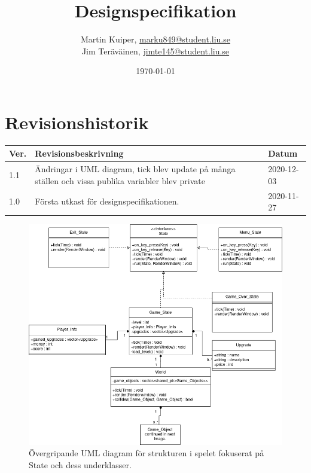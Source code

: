 \documentclass{TDP005mall}
\author{Martin Kuiper, \url{marku849@student.liu.se}\\
  Jim Teräväinen, \url{jimte145@student.liu.se}}
\title{Designspecifikation}
\date{\today}
\begin{document}
\projectpage
\section{Revisionshistorik}
\begin{table}[!h]
\begin{tabularx}{\linewidth}{|l|X|l|}
\hline
Ver. & Revisionsbeskrivning & Datum \\\hline
1.1 & Ändringar i UML diagram, tick blev update på många ställen och vissa publika variabler blev private & 2020-12-03 \\\hline
1.0 & Första utkast för designspecifikationen. & 2020-11-27 \\\hline
\end{tabularx}
\end{table}

\begin{figure}[H]
         \begin{center}
             \includegraphics[width=15cm]{Graphic/overview_part1.png}
             \caption{\label{fig:1} Övergripande UML diagram för strukturen i spelet fokuserat på State och dess underklasser.}
         \end{center}
\end{figure}
\end{document}
